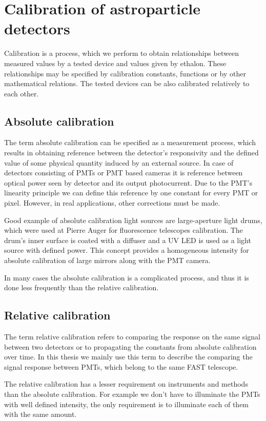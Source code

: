 
\chapter{Calibration of astroparticle detectors}
Calibration is a process, which we perform to obtain relationships between measured values by a tested device and values given by ethalon. These relationships may be specified by calibration constants, functions or by other mathematical relations. The tested devices can be also calibrated relatively to each other.
\par
\section{Absolute calibration}
The term absolute calibration can be specified as a measurement process, which results in obtaining reference between the detector's responsivity and the defined value of some physical quantity induced by an external source. In case of detectors consisting of PMTs or PMT based cameras it is reference between optical power seen by detector and its output photocurrent. Due to the PMT's linearity principle we can define this reference by one constant for every PMT or pixel. However, in real applications, other corrections must be made.

\par
Good example of absolute calibration light sources are large-aperture light drums, which were used at Pierre Auger for fluorescence telescopes calibration. The drum's inner surface is coated with a diffuser and a UV LED is used as a light source with defined power. This concept provides a homogeneous intensity for absolute calibration of large mirrors along with the PMT camera. 

\par
In many cases the absolute calibration is a complicated process, and thus it is done less frequently than the relative calibration.

\section{Relative calibration}
The term relative calibration refers to comparing the response on the same signal between two detectors or to propagating the constants from absolute calibration over time.
In this thesis we mainly use this term to describe the comparing the signal response between PMTs, which belong to the same FAST telescope. 
\par
The relative calibration has a lesser requirement on instruments and methods than the absolute calibration. For example we don't have to illuminate the PMTs with well defined intensity, the only requirement is to illuminate each of them with the same amount. 


